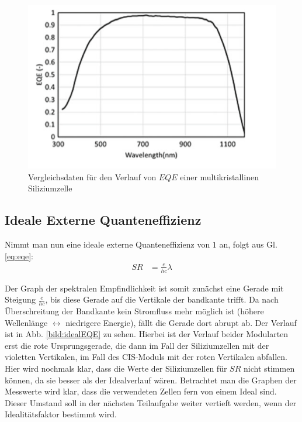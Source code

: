 
\begin{figure}[ht]
    \centering
    \includegraphics[scale=0.75]{Bilder/TheorieEQE.png}
    \caption{Vergleichsdaten für den Verlauf von $EQE$ einer multikristallinen Siliziumzelle \protect \footnotemark}
    \label{bild:ThEQE}
\end{figure}



\clearpage
\subsection{Ideale Externe Quanteneffizienz}

Nimmt man nun eine ideale externe Quanteneffizienz von $1$ an, folgt aus Gl. \ref{eq:eqe}:
\begin{align}
SR &= \frac{e}{hc}\lambda
\end{align}

Der Graph der spektralen Empfindlichkeit ist somit zunächst eine Gerade mit Steigung $\frac{e}{hc}$, bis diese Gerade auf die
Vertikale der bandkante trifft. Da nach Überschreitung der Bandkante kein Stromfluss mehr möglich ist (höhere Wellenlänge 
$\leftrightarrow$ niedrigere Energie), fällt die Gerade dort abrupt ab. Der Verlauf ist in Abb. \ref{bild:idealEQE} zu sehen.
Hierbei ist der Verlauf beider Modularten erst die rote Ursprungsgerade, die dann im Fall der Siliziumzellen mit der violetten
Vertikalen, im Fall des CIS-Moduls mit der roten Vertikalen abfallen.
Hier wird 
nochmals klar, dass die Werte der Siliziumzellen für $SR$ nicht stimmen können, da sie besser als der Idealverlauf wären.
Betrachtet man die Graphen der Messwerte wird klar, dass die verwendeten Zellen fern von einem Ideal sind. Dieser Umstand soll in der
nächsten Teilaufgabe weiter vertieft werden, wenn der Idealitätsfaktor bestimmt wird.

